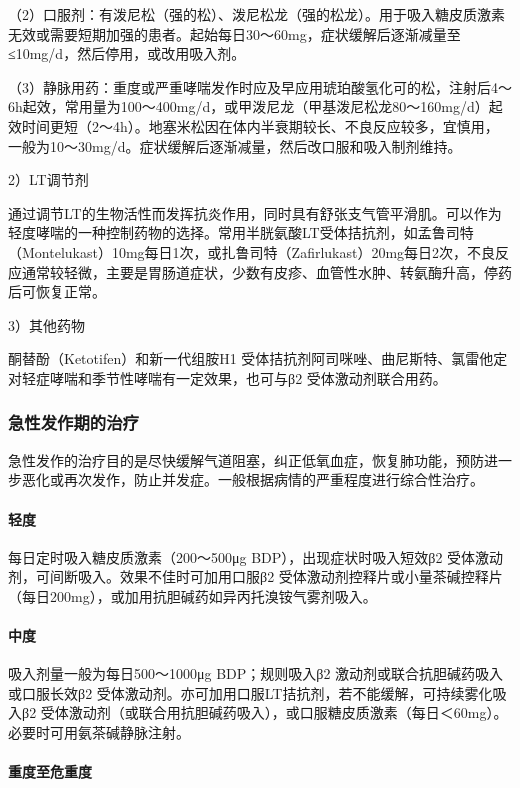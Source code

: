 （2）口服剂：有泼尼松（强的松）、泼尼松龙（强的松龙）。用于吸入糖皮质激素无效或需要短期加强的患者。起始每日30～60mg，症状缓解后逐渐减量至≤10mg/d，然后停用，或改用吸入剂。

（3）静脉用药：重度或严重哮喘发作时应及早应用琥珀酸氢化可的松，注射后4～6h起效，常用量为100～400mg/d，或甲泼尼龙（甲基泼尼松龙80～160mg/d）起效时间更短（2～4h）。地塞米松因在体内半衰期较长、不良反应较多，宜慎用，一般为10～30mg/d。症状缓解后逐渐减量，然后改口服和吸入制剂维持。

2）LT调节剂

通过调节LT的生物活性而发挥抗炎作用，同时具有舒张支气管平滑肌。可以作为轻度哮喘的一种控制药物的选择。常用半胱氨酸LT受体拮抗剂，如孟鲁司特（Montelukast）10mg每日1次，或扎鲁司特（Zafirlukast）20mg每日2次，不良反应通常较轻微，主要是胃肠道症状，少数有皮疹、血管性水肿、转氨酶升高，停药后可恢复正常。

3）其他药物

酮替酚（Ketotifen）和新一代组胺H{1}
受体拮抗剂阿司咪唑、曲尼斯特、氯雷他定对轻症哮喘和季节性哮喘有一定效果，也可与β{2}
受体激动剂联合用药。

\subsubsection{急性发作期的治疗}

急性发作的治疗目的是尽快缓解气道阻塞，纠正低氧血症，恢复肺功能，预防进一步恶化或再次发作，防止并发症。一般根据病情的严重程度进行综合性治疗。
\paragraph{轻度}

每日定时吸入糖皮质激素（200～500μg BDP），出现症状时吸入短效β{2}
受体激动剂，可间断吸入。效果不佳时可加用口服β{2}
受体激动剂控释片或小量茶碱控释片（每日200mg），或加用抗胆碱药如异丙托溴铵气雾剂吸入。
\paragraph{中度}

吸入剂量一般为每日500～1000μg BDP；规则吸入β{2}
激动剂或联合抗胆碱药吸入或口服长效β{2}
受体激动剂。亦可加用口服LT拮抗剂，若不能缓解，可持续雾化吸入β{2}
受体激动剂（或联合用抗胆碱药吸入），或口服糖皮质激素（每日＜60mg）。必要时可用氨茶碱静脉注射。
\paragraph{重度至危重度}

